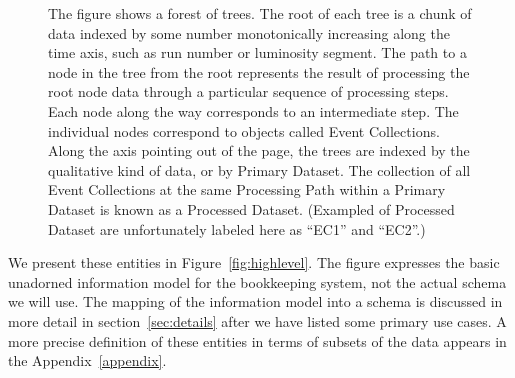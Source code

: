 \documentclass{cmspaper}
\begin{document}
{\begin{figure}[hbtp]
  \begin{center}
    \caption{The figure shows a forest of trees.  The root of each tree is a 
chunk of data indexed by some number monotonically increasing along the time axis, 
such as run number or luminosity segment.
The path to a node in the tree from the root represents the result of processing 
the root node data through a particular sequence of processing steps.  Each node 
along the way corresponds to an intermediate step.  The individual nodes correspond to objects 
called Event Collections.  Along the axis pointing out of the page, the trees are 
indexed by the qualitative kind of data, or by Primary Dataset. The collection of all 
Event Collections at the same Processing Path within a Primary Dataset is known as a
Processed Dataset. (Exampled of Processed Dataset are unfortunately labeled here 
as ``EC1'' and ``EC2''.)}
    \label{fig:forest}
  \end{center}
\end{figure}




We present these entities in Figure~\ref{fig:highlevel}.  
The figure expresses the basic unadorned information model
for the bookkeeping system, not the actual schema we will use.
The mapping of the information model into a schema is discussed in more
detail in section~\ref{sec:details} after we have listed some primary use
cases.  A more precise definition of these entities in terms of subsets of
the data appears in the Appendix~\ref{appendix}.

}
\end{document}
